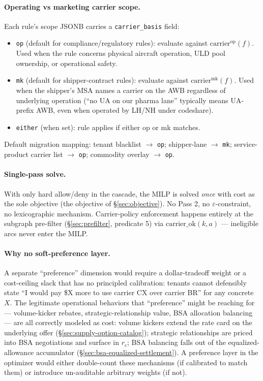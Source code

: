 \documentclass[11pt,a4paper]{article}
\theoremstyle{definition}
\begin{document}
\paragraph{Operating vs marketing carrier scope.}
Each rule's scope JSONB carries a \texttt{carrier\_basis} field:
\begin{itemize}[noitemsep]
  \item \texttt{op} (default for compliance/regulatory rules): evaluate
        against $\text{carrier}^{\text{op}}(f)$. Used when the rule concerns
        physical aircraft operation, ULD pool ownership, or operational
        safety.
  \item \texttt{mk} (default for shipper-contract rules): evaluate against
        $\text{carrier}^{\text{mk}}(f)$. Used when the shipper's MSA names a
        carrier on the AWB regardless of underlying operation (``no UA on
        our pharma lane'' typically means UA-prefix AWB, even when operated
        by LH/NH under codeshare).
  \item \texttt{either} (when set): rule applies if either op or mk matches.
\end{itemize}
Default migration mapping: tenant blacklist $\to$ \texttt{op}; shipper-lane
$\to$ \texttt{mk}; service-product carrier list $\to$ \texttt{op};
commodity overlay $\to$ \texttt{op}.

\paragraph{Single-pass solve.}
With only hard allow/deny in the cascade, the MILP is solved \emph{once}
with cost as the sole objective (the objective of \S\ref{sec:objective}).
No Pass 2, no $\varepsilon$-constraint, no lexicographic mechanism.
Carrier-policy enforcement happens entirely at the subgraph pre-filter
(\S\ref{sec:prefilter}, predicate 5) via $\text{carrier\_ok}(k, a)$ ---
ineligible arcs never enter the MILP.

\paragraph{Why no soft-preference layer.}
A separate ``preference'' dimension would require a dollar-tradeoff weight
or a cost-ceiling slack that has no principled calibration: tenants
cannot defensibly state ``I would pay \$X more to use carrier CX over
carrier BR'' for any concrete $X$. The legitimate operational behaviors
that ``preference'' might be reaching for --- volume-kicker rebates,
strategic-relationship value, BSA allocation balancing --- are all
correctly modeled as cost: volume kickers extend the rate card on the
underlying offer (\S\ref{sec:supply-option-catalog}); strategic
relationships are priced into BSA negotiations and surface in $r_c$;
BSA balancing falls out of the equalized-allowance accumulator
(\S\ref{sec:bsa-equalized-settlement}). A preference layer in the
optimizer would either double-count these mechanisms (if calibrated to
match them) or introduce un-auditable arbitrary weights (if not).
\end{document}
